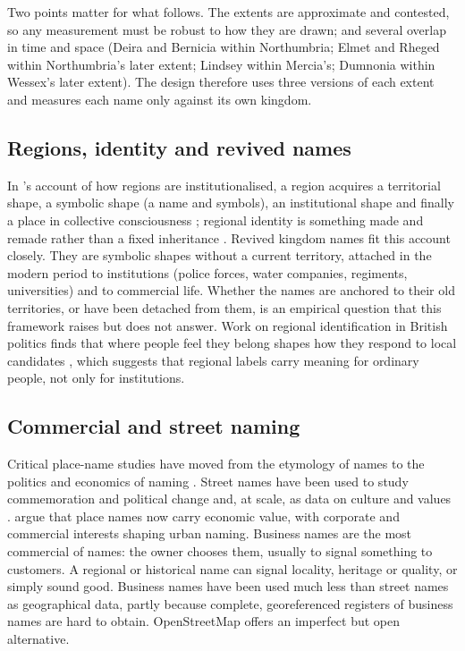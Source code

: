 \documentclass[11pt,a4paper]{article}
\begin{document}
Two points matter for what follows. The extents are approximate and contested, so any measurement must be robust to how they are drawn; and several overlap in time and space (Deira and Bernicia within Northumbria; Elmet and Rheged within Northumbria's later extent; Lindsey within Mercia's; Dumnonia within Wessex's later extent). The design therefore uses three versions of each extent and measures each name only against its own kingdom.

\subsection{Regions, identity and revived names}
In \citeauthor{paasi1986}'s account of how regions are institutionalised, a region acquires a territorial shape, a symbolic shape (a name and symbols), an institutional shape and finally a place in collective consciousness \citep{paasi1986}; regional identity is something made and remade rather than a fixed inheritance \citep{paasi2003}. Revived kingdom names fit this account closely. They are symbolic shapes without a current territory, attached in the modern period to institutions (police forces, water companies, regiments, universities) and to commercial life. Whether the names are anchored to their old territories, or have been detached from them, is an empirical question that this framework raises but does not answer. Work on regional identification in British politics finds that where people feel they belong shapes how they respond to local candidates \citep{collignonsajuria2018}, which suggests that regional labels carry meaning for ordinary people, not only for institutions.

\subsection{Commercial and street naming}
Critical place-name studies have moved from the etymology of names to the politics and economics of naming \citep{roseredwood2010}. Street names have been used to study commemoration and political change \citep{azaryahu1996,alderman2000,light2004,lightyoung2014} and, at scale, as data on culture and values \citep{otoperalias2018,bancilhon2021,gutierrez2022}. \citet{lightyoung2015} argue that place names now carry economic value, with corporate and commercial interests shaping urban naming. Business names are the most commercial of names: the owner chooses them, usually to signal something to customers. A regional or historical name can signal locality, heritage or quality, or simply sound good. Business names have been used much less than street names as geographical data, partly because complete, georeferenced registers of business names are hard to obtain. OpenStreetMap offers an imperfect but open alternative.
\end{document}
